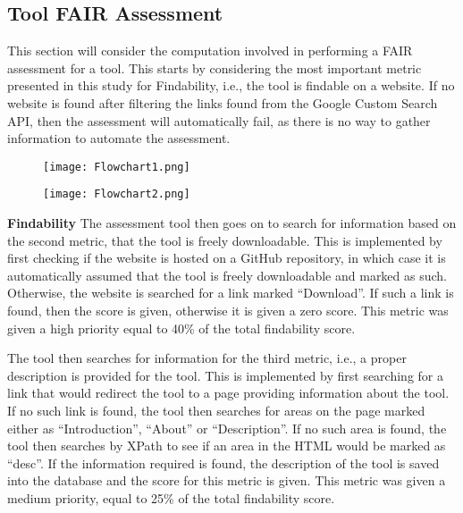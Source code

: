 \documentclass{cisfyp}
\begin{document}
\subsection{Tool FAIR Assessment}
This section will consider the computation involved in performing a FAIR assessment for a tool. This starts by considering the most important metric presented in this study for Findability, i.e., the tool is findable on a website. If no website is found after filtering the links found from the Google Custom Search API, then the assessment will automatically fail, as there is no way to gather information to automate the assessment.\newline
\begin{figure}
\centering
\begin{minipage}{.5\textwidth}
  \centering
  \texttt{[image: Flowchart1.png]}
  \label{fig:test1}
\end{minipage}\qquad
\begin{minipage}{.4\textwidth}
  \centering
  \texttt{[image: Flowchart2.png]}
  \label{fig:test2}
\end{minipage}
\end{figure}

\textbf{Findability}\newline
The assessment tool then goes on to search for information based on the second metric, that the tool is freely downloadable. This is implemented by first checking if the website is hosted on a GitHub repository, in which case it is automatically assumed that the tool is freely downloadable and marked as such. Otherwise, the website is searched for a link marked ``Download''. If such a link is found, then the score is given, otherwise it is given a zero score. This metric was given a high priority equal to 40\% of the total findability score.

The tool then searches for information for the third metric, i.e., a proper description is provided for the tool. This is implemented by first searching for a link that would redirect the tool to a page providing information about the tool. If no such link is found, the tool then searches for areas on the page marked either as ``Introduction'', ``About'' or ``Description''. If no such area is found, the tool then searches by XPath to see if an area in the HTML would be marked as ``desc''. If the information required is found, the description of the tool is saved into the database and the score for this metric is given. This metric was given a medium priority, equal to 25\% of the total findability score.
\end{document}
